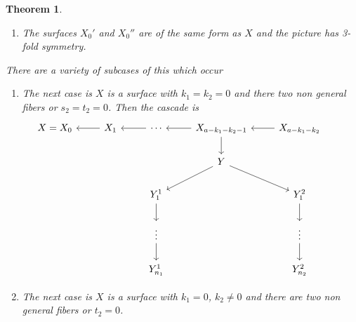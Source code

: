 \documentclass[12pt]{amsbook}
\theoremstyle{plain}
\newtheorem{thm}{Theorem}[section]
\begin{document}
\begin{thm}
\begin{enumerate}
\item The surfaces $X_0'$ and $X_0''$ are of the same form as $X$ and the picture has 3-fold symmetry.
\end{enumerate}
There are a variety of subcases of this which occur 
\begin{enumerate}
\item The next case is $X$ is a surface with $k_1 = k_2 = 0$ and there two non general fibers or $s_2 = t_2 = 0$. Then the cascade is 
\[
\begin{tikzcd}
X = X_0 & X_1 \arrow[l] & \cdots \arrow[l] & X_{a-k_1-k_2-1} \arrow[l] \arrow[d] & X_{a-k_1-k_2} \arrow[l]  &  \\
        &               &                  & Y \arrow[ld] \arrow[rd]             &                                   &                     \\
        &               & Y_1^1 \arrow[d]  &                                     & Y_1^2 \arrow[d]                   &                     \\
        &               & \vdots \arrow[d] &                                     & \vdots \arrow[d]                  &                     \\
        &               & Y_{n_1}^1        &                                     & Y_{n_2}^2                         &                    
\end{tikzcd}
\]
\item The next case is $X$ is a surface with $k_1 = 0$, $k_2 \neq 0$ and there are two non general fibers or $t_2 = 0$. 
\[
\]
\end{enumerate}
\end{thm}
\end{document}
